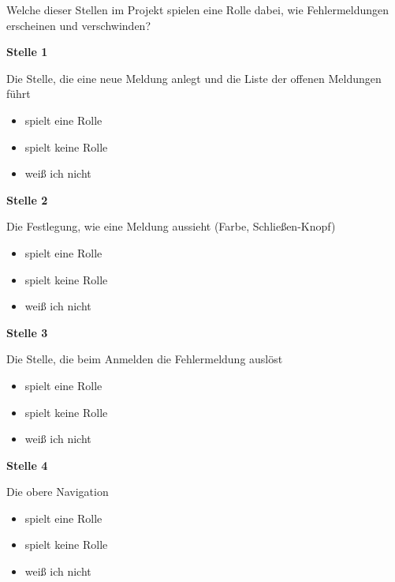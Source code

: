 Welche dieser Stellen im Projekt spielen eine Rolle dabei, wie Fehlermeldungen erscheinen und verschwinden?

\noindent\begin{minipage}{\linewidth}
\textbf{Stelle 1}\par
Die Stelle, die eine neue Meldung anlegt und die Liste der offenen Meldungen führt

\begin{itemize}[nosep,leftmargin=2.4em]
\item[\kreuz] spielt eine Rolle
\item[\kreuz] spielt keine Rolle
\item[\kreuz] weiß ich nicht
\end{itemize}
\end{minipage}

\medskip

\noindent\begin{minipage}{\linewidth}
\textbf{Stelle 2}\par
Die Festlegung, wie eine Meldung aussieht (Farbe, Schließen-Knopf)

\begin{itemize}[nosep,leftmargin=2.4em]
\item[\kreuz] spielt eine Rolle
\item[\kreuz] spielt keine Rolle
\item[\kreuz] weiß ich nicht
\end{itemize}
\end{minipage}

\medskip

\noindent\begin{minipage}{\linewidth}
\textbf{Stelle 3}\par
Die Stelle, die beim Anmelden die Fehlermeldung auslöst

\begin{itemize}[nosep,leftmargin=2.4em]
\item[\kreuz] spielt eine Rolle
\item[\kreuz] spielt keine Rolle
\item[\kreuz] weiß ich nicht
\end{itemize}
\end{minipage}

\medskip

\noindent\begin{minipage}{\linewidth}
\textbf{Stelle 4}\par
Die obere Navigation

\begin{itemize}[nosep,leftmargin=2.4em]
\item[\kreuz] spielt eine Rolle
\item[\kreuz] spielt keine Rolle
\item[\kreuz] weiß ich nicht
\end{itemize}
\end{minipage}

